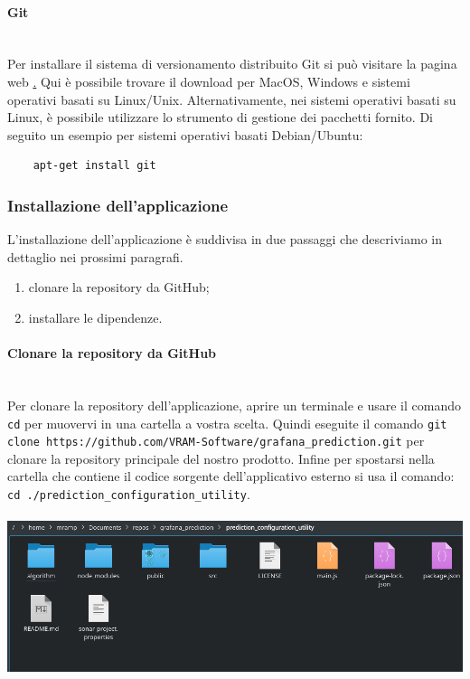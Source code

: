 \paragraph{Git}\mbox{}\\ [1mm]
Per installare il sistema di versionamento distribuito Git si può visitare la pagina web \href{https://git-scm.com/downloads}. Qui è possibile trovare il download per MacOS, Windows e sistemi operativi basati su Linux/Unix. Alternativamente, nei sistemi operativi basati su Linux, è possibile utilizzare lo strumento di gestione dei pacchetti fornito.  Di seguito un esempio per sistemi operativi basati Debian/Ubuntu: \\
\begin{verbatim}
    apt-get install git
\end{verbatim}

\subsubsection{Installazione dell'applicazione}
L'installazione dell'applicazione è suddivisa in due passaggi che descriviamo in dettaglio nei prossimi paragrafi.
\begin{enumerate}
    \item clonare la repository da GitHub;
    \item installare le dipendenze.
\end{enumerate}

\paragraph{Clonare la repository da GitHub}\mbox{}\\ [1mm]
Per clonare la repository dell'applicazione, aprire un terminale e usare il comando \texttt{cd} per muovervi in una cartella a vostra scelta. Quindi eseguite il comando \verb|git clone https://github.com/VRAM-Software/grafana_prediction.git| per clonare la repository principale del nostro prodotto.
Infine per spostarsi nella cartella che contiene il codice sorgente dell'applicativo esterno si usa il comando: \verb|cd ./prediction_configuration_utility|.
\\
\\
\includegraphics[width=\textwidth,height=\textheight,keepaspectratio]{img/directoryProject.png}


